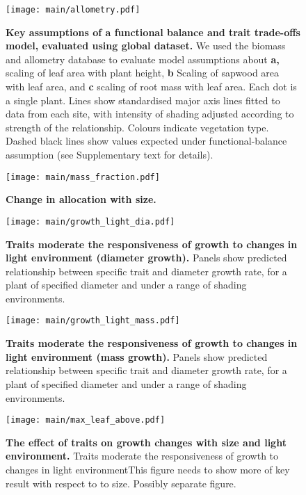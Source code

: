 \documentclass[a4paper,11pt]{article}
\begin{document}
\begin{figure}[ht]
\centering
\texttt{[image: main/allometry.pdf]}
\caption{\textbf{Key assumptions of a functional balance and trait
trade-offs model, evaluated using global dataset.} We used the biomass and
allometry database to evaluate model assumptions about \textbf{a,}
scaling of leaf area with plant height, \textbf{b} Scaling of sapwood
area with leaf area, and \textbf{c} scaling of root mass with leaf area.
Each dot is a single plant. Lines show standardised major axis lines
fitted to data from each site, with intensity of shading adjusted
according to strength of the relationship. Colours indicate vegetation
type. Dashed black lines show values expected under functional-balance
assumption (see Supplementary text for details). \label{fig:assumptions}}
\end{figure}

\newpage

\begin{figure}[ht]
\centering
\texttt{[image: main/mass\_fraction.pdf]}
\caption{\textbf{Change in allocation with size.}
\label{fig:mass_fraction}}
\end{figure}

\newpage

\begin{figure}[ht]
\centering
\texttt{[image: main/growth\_light\_dia.pdf]}
\caption{\textbf{Traits moderate the responsiveness of growth to changes
in light environment (diameter growth).} Panels show predicted relationship between
specific trait and diameter growth rate, for a plant of specified
diameter and under a range of shading environments.
\label{fig:growth_light_dia}}
\end{figure}

\begin{figure}[ht]
\centering
\texttt{[image: main/growth\_light\_mass.pdf]}
\caption{\textbf{Traits moderate the responsiveness of growth to changes
in light environment (mass growth).} Panels show predicted relationship between
specific trait and diameter growth rate, for a plant of specified
diameter and under a range of shading environments.
\label{fig:growth_light_mass}}
\end{figure}

\newpage

\begin{figure}[ht]
\centering
\texttt{[image: main/max\_leaf\_above.pdf]}
\caption{\textbf{The effect of traits on growth changes with size and
light environment.} Traits moderate the responsiveness of growth to changes in light
environmentThis figure needs to show more of key result with respect to to size.
Possibly separate figure. \label{fig:shifts}}
\end{figure}
\end{document}
